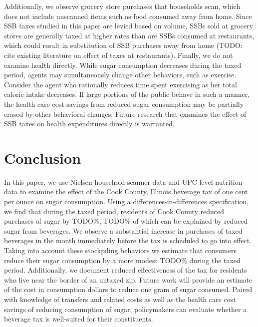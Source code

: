 \documentclass[12pt]{article}
\begin{document}
Additionally, we observe grocery store purchases that households scan, which does not include unscanned items such as food consumed away from home. Since SSB taxes studied in this paper are levied based on volume, SSBs sold at grocery stores are generally taxed at higher rates than are SSBs consumed at restaurants, which could result in substitution of SSB purchases away from home (TODO: cite existing literature on effect of taxes at restaurants). Finally, we do not examine health directly. While sugar consumption decreases during the taxed period, agents may simultaneously change other behaviors, such as exercise. Consider the agent who rationally reduces time spent exercising as her total caloric intake decreases. If large portions of the public behave in such a manner, the health care cost savings from reduced sugar consumption may be partially erased by other behavioral changes. Future research that examines the effect of SSB taxes on health expenditures directly is warranted.


\section{Conclusion} \label{conclusion}

In this paper, we use Nielsen household scanner data and UPC-level nutrition data to examine the effect of the Cook County, Illinois beverage tax of one cent per ounce on sugar consumption. Using a differences-in-differences specification, we find that during the taxed period, residents of Cook County reduced purchases of sugar by TODO\%, TODO\% of which can be explained by reduced sugar from beverages. We observe a substantial increase in purchases of taxed beverages in the month immediately before the tax is scheduled to go into effect. Taking into account these stockpiling behaviors we estimate that consumers reduce their sugar consumption by a more modest TODO\% during the taxed period. Additionally, we document reduced effectiveness of the tax for residents who live near the border of an untaxed zip. Future work will provide an estimate of the cost in consumption dollars to reduce one gram of sugar consumed. Paired with knowledge of transfers and related costs as well as the health care cost savings of reducing consumption of sugar, policymakers can evaluate whether a beverage tax is well-suited for their constituents.
\end{document}
